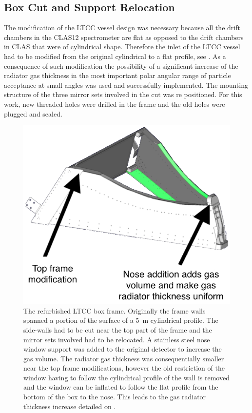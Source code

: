 \subsection{Box Cut and Support Relocation}
\label{sec:mirrorRepos}

The modification of the LTCC vessel design was necessary because all the drift chambers in the CLAS12 spectrometer
are flat as opposed to the drift chambers in CLAS that were of cylindrical shape. Therefore the inlet
of the LTCC vessel had to be modified from the original cylindrical to a flat profile, see . As a consequence of such
modification the possibility of a significant increase of the radiator gas thickness in the most important
polar angular range of particle acceptance at small angles was used and successfully implemented.
The mounting structure of the three mirror sets involved in the cut was
re positioned. For this work, new threaded holes were drilled in the frame and the old holes were plugged and sealed.

\begin{figure}[ht]
	\centering
	\includegraphics[width=1.0\columnwidth, height=0.75\columnwidth]{img/boxCut.png}
	\caption{The refurbished LTCC box frame. Originally the frame walls spanned a portion of the surface of a 5~m
          cylindrical profile. The side-walls had to be cut near the top part of the frame and the mirror
          sets involved had to be relocated. A stainless steel nose window support was added to the original detector to
          increase the gas volume. The radiator gas thickness was consequentially smaller near the top frame modifications,
          however the old restriction of the window having to follow the cylindrical profile of the wall is removed and
          the window can be inflated to follow the flat profile from the bottom of the box to the nose. This leads
          to the gas radiator thickness increase detailed on . }
	\label{fig:boxCut}
\end{figure}

